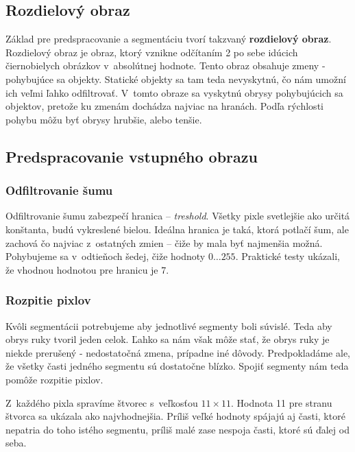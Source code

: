 \subsection{Rozdielový obraz}
\label{chap:diffimg}

Základ pre predspracovanie a segmentáciu tvorí takzvaný \textbf{rozdielový obraz}. Rozdielový obraz je obraz, ktorý vznikne odčítaním 2 po sebe idúcich čiernobielych obrázkov v~absolútnej hodnote. Tento obraz obsahuje zmeny - pohybujúce sa objekty. Statické objekty sa tam teda nevyskytnú, čo nám umožní ich veľmi ľahko odfiltrovať. V~tomto obraze sa vyskytnú obrysy pohybujúcich sa objektov, pretože ku zmenám dochádza najviac na hranách. Podľa rýchlosti pohybu môžu byť obrysy hrubšie, alebo tenšie. 

\subsection{Predspracovanie vstupného obrazu}
\label{chap:preprocess}



\subsubsection{Odfiltrovanie šumu}
Odfiltrovanie šumu zabezpečí hranica -- \textit{treshold}. Všetky pixle svetlejšie ako určitá konštanta, budú vykreslené bielou. Ideálna hranica je taká, ktorá potlačí šum, ale zachová čo najviac z~ostatných zmien -- čiže by mala byť najmenšia možná. Pohybujeme sa v~odtieňoch šedej, čiže hodnoty $0\dots 255$. Praktické testy ukázali, že vhodnou hodnotou pre hranicu je 7.

\subsubsection{Rozpitie pixlov}

Kvôli segmentácii potrebujeme aby jednotlivé segmenty boli súvislé. Teda aby obrys ruky tvoril jeden celok.
Ľahko sa nám však môže stať, že obrys ruky je niekde prerušený - nedostatočná zmena, prípadne iné dôvody. Predpokladáme ale, že všetky časti jedného segmentu sú dostatočne blízko. Spojiť segmenty nám teda pomôže rozpitie pixlov. 

Z~každého pixla spravíme štvorec s~veľkosťou $11\times 11$.
Hodnota 11 pre stranu štvorca sa ukázala ako najvhodnejšia. 
Príliš veľké hodnoty spájajú aj časti, ktoré nepatria do toho istého segmentu, príliš malé zase nespoja časti, ktoré sú ďalej od seba.

